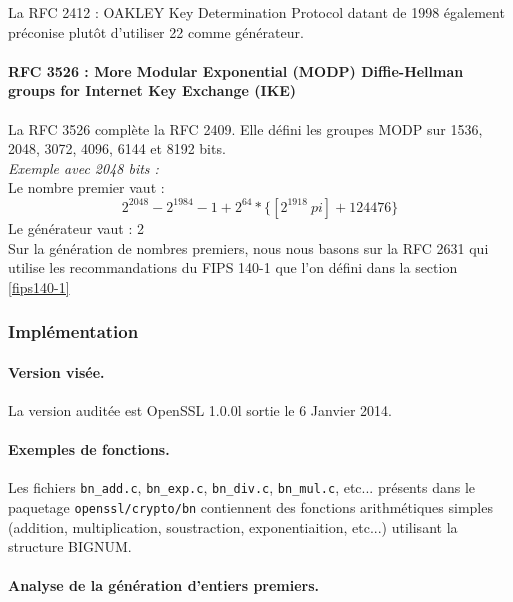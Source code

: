 			La RFC 2412 : OAKLEY Key Determination Protocol datant de 1998 également \cite{rfc2412} préconise plutôt d'utiliser 22 comme générateur.

			\paragraph{RFC 3526 : More Modular Exponential (MODP) Diffie-Hellman groups for Internet Key Exchange (IKE)\\}

			La RFC 3526 \cite{rfc3526} complète la RFC 2409. Elle défini les groupes MODP sur 1536, 2048, 3072, 4096, 6144 et 8192 bits.\\

			\textit{Exemple avec 2048 bits :}\\
			Le nombre premier vaut :
			$$ 2^{2048} - 2^{1984} - 1 + 2^{64} * \{ [2^{1918}\ pi] + 124476 \} $$
			Le générateur vaut : 2\\

			Sur la génération de nombres premiers, nous nous basons sur la RFC 2631 qui utilise les recommandations du FIPS 140-1 que l'on défini dans la section \ref{fips140-1}


		\subsubsection{Implémentation}
			\paragraph{Version visée. \\}

			La version auditée est OpenSSL 1.0.0l sortie le 6 Janvier 2014.

			\paragraph{Exemples de fonctions. \\}

			Les fichiers \texttt{bn\_add.c}, \texttt{bn\_exp.c}, \texttt{bn\_div.c}, \texttt{bn\_mul.c}, etc... présents dans le paquetage \texttt{openssl/crypto/bn} contiennent des fonctions arithmétiques simples (addition, multiplication, soustraction, exponentiaition, etc...) utilisant la structure BIGNUM.

			\paragraph{Analyse de la génération d'entiers premiers.\\}

